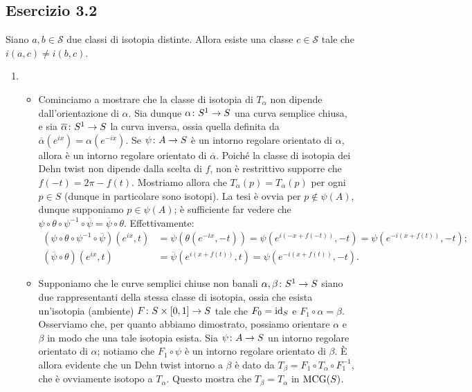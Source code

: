 \subsection*{Esercizio 3.2}
\begin{lemma}
Siano $a,b\in\mathcal{S}$ due classi di isotopia distinte. Allora esiste una classe $c\in\mathcal{S}$ tale che $i(a,c)\neq i(b,c)$.
\end{lemma}
\begin{enumerate}[(1)]
\item \begin{itemize}
\item Cominciamo a mostrare che la classe di isotopia di $T_\alpha$ non dipende dall'orientazione di $\alpha$. Sia dunque $\map{\alpha}{S^1}{S}$ una curva semplice chiusa, e sia $\map{\overline\alpha}{S^1}{S}$ la curva inversa, ossia quella definita da $\overline\alpha(e^{ix})=\alpha(e^{-ix})$. Se $\map{\psi}{A}{S}$ è un intorno regolare orientato di $\alpha$, allora
è un intorno regolare orientato di $\overline\alpha$. Poiché la classe di isotopia dei Dehn twist non dipende dalla scelta di $f$, non è restrittivo supporre che $f(-t)=2\pi-f(t)$. Mostriamo allora che $T_\alpha(p)=T_{\overline\alpha}(p)$ per ogni $p\in S$ (dunque in particolare sono isotopi). La tesi è ovvia per $p\not\in\psi(A)$, dunque supponiamo $p\in\psi(A)$; è sufficiente far vedere che $\psi\circ\theta\circ\psi^{-1}\circ\overline\psi=\overline\psi\circ\theta$. Effettivamente:
\begin{align*}
(\psi\circ\theta\circ\psi^{-1}\circ\overline\psi)(e^{ix},t)&=\psi(\theta(e^{-ix},-t))=\psi(e^{i(-x+f(-t))},-t)=\psi(e^{-i(x+f(t))},-t);\\
(\overline\psi\circ\theta)(e^{ix},t)&=\overline\psi(e^{i(x+f(t))},t)=\psi(e^{-i(x+f(t))},-t).
\end{align*}
\item Supponiamo che le curve semplici chiuse non banali $\map{\alpha,\beta}{S^1}{S}$ siano due rappresentanti della stessa classe di isotopia, ossia che esista un'isotopia (ambiente) $\map{F}{S\times[0,1]}{S}$ tale che $F_0=\operatorname{id}_S$ e $F_1\circ\alpha=\beta$. Osserviamo che, per quanto abbiamo dimostrato, possiamo orientare $\alpha$ e $\beta$ in modo che una tale isotopia esista. Sia $\map{\psi}{A}{S}$ un intorno regolare orientato di $\alpha$; notiamo che $F_1\circ\psi$ è un intorno regolare orientato di $\beta$. È allora evidente che un Dehn twist intorno a $\beta$ è dato da $T_\beta=F_1\circ T_\alpha\circ F_1^{-1}$, che è ovviamente isotopo a $T_\alpha$. Questo mostra che $T_\beta=T_\alpha$ in $\operatorname{MCG}(S)$.

\end{itemize}
\end{enumerate}
